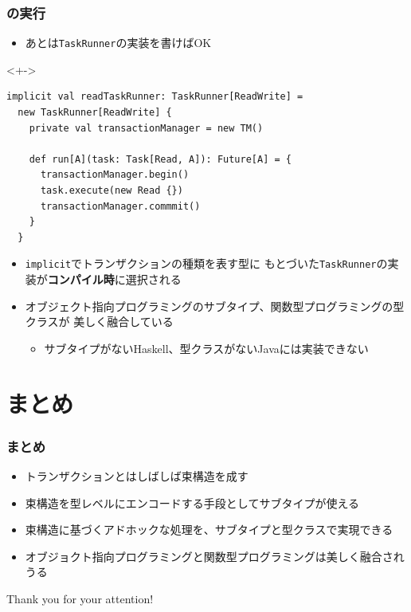 \begin{frame}[fragile]
  \frametitle{\Fujitask の実行}

  \begin{itemize}
    \item<+-> あとは\lstinline|TaskRunner|の実装を書けばOK
  \end{itemize}

  \begin{uncoverenv}<+->
\begin{lstlisting}[style=scala]
implicit val readTaskRunner: TaskRunner[ReadWrite] =
  new TaskRunner[ReadWrite] {
    private val transactionManager = new TM()
    
    def run[A](task: Task[Read, A]): Future[A] = {
      transactionManager.begin()
      task.execute(new Read {})
      transactionManager.commmit()
    }
  }
\end{lstlisting}
  \end{uncoverenv}

  \begin{itemize}
    \item<+-> \lstinline|implicit|でトランザクションの種類を表す型に
    もとづいた\lstinline|TaskRunner|の実装が\textbf{コンパイル時}に選択される

    \item<+-> オブジェクト指向プログラミングのサブタイプ、関数型プログラミングの型クラスが
    美しく融合している
    \begin{itemize}
      \item サブタイプがないHaskell、型クラスがないJavaに\Fujitask は実装できない
    \end{itemize}
  \end{itemize}
\end{frame}

\section{まとめ}

\begin{frame}
  \frametitle{まとめ}

  \pause
  \begin{itemize}
    \item<+-> トランザクションとはしばしば束構造を成す
    \item<+-> 束構造を型レベルにエンコードする手段としてサブタイプが使える
    \item<+-> 束構造に基づくアドホックな処理を、サブタイプと型クラスで実現できる
    \item<+-> オブジョクト指向プログラミングと関数型プログラミングは美しく融合されうる
  \end{itemize}
\end{frame}

\begin{frame}
  \centering
  {\Huge Thank you for your attention!}
\end{frame}


